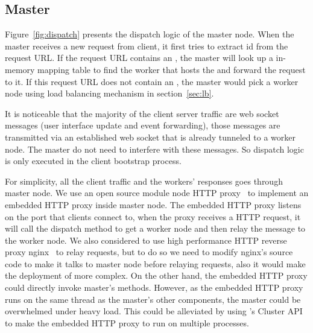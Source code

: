 \subsection{Master}
Figure~\ref{fig:dispatch} presents the dispatch logic of the master node.
When the master receives a new request from client,
it first tries to extract \appins{} id from the request URL.
If the request URL contains an \appins{},
the master will look up a in-memory mapping table to find the worker
that hosts the \appins{} and forward the request to it.
If this request URL does not contain an \appins{},
the master would pick a worker node using load balancing mechanism in section~\ref{sec:lb}.



It is noticeable that the majority of the client server traffic are
web socket messages (user interface update and event forwarding),
those messages are transmitted via an established web socket that is already tunneled to 
a worker node.
The master do not need to interfere with these messages.
So dispatch logic is only executed in the client bootstrap process.

For simplicity, all the client traffic and the workers' responses goes through master node.
We use an open source \nodejs{} module node HTTP proxy~\cite{nodeproxy} to implement
an embedded HTTP proxy inside master node.
The embedded HTTP proxy listens on the port that clients connect to,
when the proxy receives a HTTP request,
it will call the dispatch method to get a worker node and then relay the message
to the worker node.
We also considered to use high performance HTTP reverse proxy nginx~\cite{nginx}
to relay requests,
but to do so we need to modify nginx's source code to 
make it talks to master node before relaying requests,
also it would make the deployment of \cb{} more complex.
On the other hand, the embedded HTTP proxy could directly invoke master's methods.
However, as the embedded HTTP proxy runs on the same thread as the master's other
components, the master could be overwhelmed under heavy load.
This could be alleviated by using \nodejs{}'s Cluster API to make the embedded HTTP
proxy to run on multiple processes.


